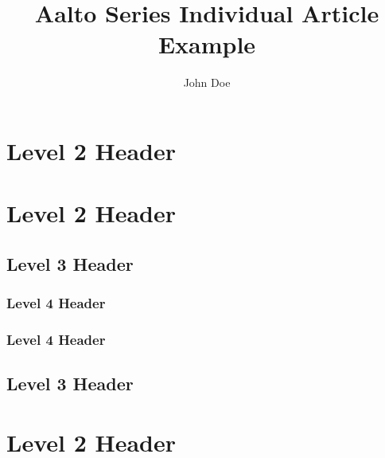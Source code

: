 \documentclass[article]{aaltoseries}
\author{John Doe}
\affiliation{John Doe University}
\title{Aalto Series Individual Article Example}
\begin{document}
\maketitle

\begin{abstract}
\lipsum[1]
\end{abstract}


\section{Level 2 Header}
\lipsum[1-2]
\section{Level 2 Header}
\lipsum[3-4]
\subsection{Level 3 Header}
\lipsum[5]
\subsubsection{Level 4 Header}
\lipsum[6]
\subsubsection{Level 4 Header}
\lipsum[7]
\subsection{Level 3 Header}
\lipsum[8]
\section{Level 2 Header}
\lipsum[9-10]
\end{document}
